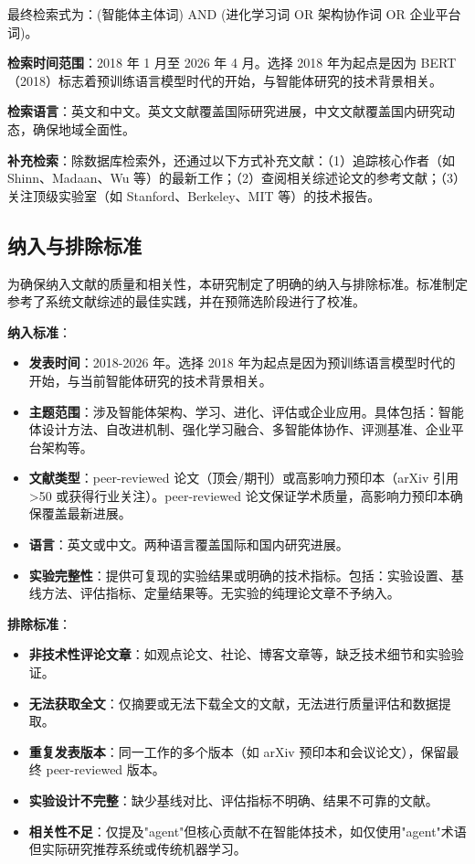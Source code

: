 \documentclass[12pt,a4paper]{article}
\begin{document}
最终检索式为：(智能体主体词) AND (进化学习词 OR 架构协作词 OR 企业平台词)。

\textbf{检索时间范围}：2018 年 1 月至 2026 年 4 月。选择 2018 年为起点是因为 BERT（2018）标志着预训练语言模型时代的开始，与智能体研究的技术背景相关。

\textbf{检索语言}：英文和中文。英文文献覆盖国际研究进展，中文文献覆盖国内研究动态，确保地域全面性。

\textbf{补充检索}：除数据库检索外，还通过以下方式补充文献：（1）追踪核心作者（如 Shinn、Madaan、Wu 等）的最新工作；（2）查阅相关综述论文的参考文献；（3）关注顶级实验室（如 Stanford、Berkeley、MIT 等）的技术报告。

\subsection{纳入与排除标准}

为确保纳入文献的质量和相关性，本研究制定了明确的纳入与排除标准。标准制定参考了系统文献综述的最佳实践，并在预筛选阶段进行了校准。

\textbf{纳入标准}：
\begin{itemize}
    \item \textbf{发表时间}：2018-2026 年。选择 2018 年为起点是因为预训练语言模型时代的开始，与当前智能体研究的技术背景相关。
    
    \item \textbf{主题范围}：涉及智能体架构、学习、进化、评估或企业应用。具体包括：智能体设计方法、自改进机制、强化学习融合、多智能体协作、评测基准、企业平台架构等。
    
    \item \textbf{文献类型}：peer-reviewed 论文（顶会/期刊）或高影响力预印本（arXiv 引用>50 或获得行业关注）。peer-reviewed 论文保证学术质量，高影响力预印本确保覆盖最新进展。
    
    \item \textbf{语言}：英文或中文。两种语言覆盖国际和国内研究进展。
    
    \item \textbf{实验完整性}：提供可复现的实验结果或明确的技术指标。包括：实验设置、基线方法、评估指标、定量结果等。无实验的纯理论文章不予纳入。
\end{itemize}

\textbf{排除标准}：
\begin{itemize}
    \item \textbf{非技术性评论文章}：如观点论文、社论、博客文章等，缺乏技术细节和实验验证。
    
    \item \textbf{无法获取全文}：仅摘要或无法下载全文的文献，无法进行质量评估和数据提取。
    
    \item \textbf{重复发表版本}：同一工作的多个版本（如 arXiv 预印本和会议论文），保留最终 peer-reviewed 版本。
    
    \item \textbf{实验设计不完整}：缺少基线对比、评估指标不明确、结果不可靠的文献。
    
    \item \textbf{相关性不足}：仅提及"agent"但核心贡献不在智能体技术，如仅使用"agent"术语但实际研究推荐系统或传统机器学习。
\end{itemize}
\end{document}
